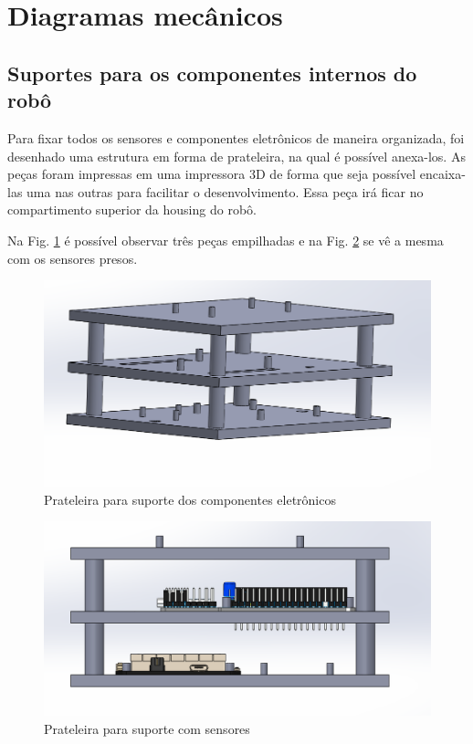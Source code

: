 \section{Diagramas mecânicos}
\label{sec:diagm}

\subsection{Suportes para os componentes internos do robô}

Para fixar todos os sensores e componentes eletrônicos de maneira organizada, foi desenhado uma estrutura em forma de prateleira, na qual é possível anexa-los. As peças foram impressas em uma impressora 3D de forma que seja possível encaixa-las uma nas outras para facilitar o desenvolvimento. Essa peça irá ficar no compartimento superior da housing do robô.

Na Fig. \ref{Prateleira} é possível observar três peças empilhadas e na Fig. \ref{Prateleiracsensor} se vê a mesma com os sensores presos.

    \begin{figure}[H]
	\centering
	\includegraphics[width=14cm]{Figures/prateleira.png}
	\caption{Prateleira para suporte dos componentes eletrônicos} \label{Prateleira}
	\end{figure}
	
	\begin{figure}[H]
	\centering
	\includegraphics[width=16cm]{Figures/prateleiracsensores.png}
	\caption{Prateleira para suporte com sensores} \label{Prateleiracsensor}
	\end{figure}

